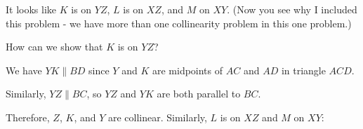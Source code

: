 


It looks like $K$ is on $YZ$, $L$ is on $XZ$, and $M$ on $XY$. (Now you see why I included this problem - we have more than one collinearity problem in this one problem.)

How can we show that $K$ is on $YZ$?





We have $YK \parallel BD$ since $Y$ and $K$ are midpoints of $AC$ and $AD$ in triangle $ACD$.

Similarly, $YZ\parallel BC$, so $YZ$ and $YK$ are both parallel to $BC$.

Therefore, $Z$, $K$, and $Y$ are collinear. Similarly, $L$ is on $XZ$ and $M$ on $XY$:




